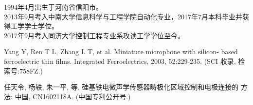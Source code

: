 \noindent 1994年4月出生于河南省信阳市。\\
\noindent 2013年9月考入中南大学信息科学与工程学院自动化专业，2017年7月本科毕业并获得工学学士学位。\\
\noindent 2017年9月考入同济大学控制工程专业系攻读工学学位至今。

\begin{enumerate}[{[}1{]}]
\item Yang Y, Ren T L, Zhang L T, et al. Miniature microphone with silicon-
  based ferroelectric thin films. Integrated Ferroelectrics, 2003,
  52:229-235. (SCI 收录, 检索号:758FZ.)
\end{enumerate}

\begin{enumerate}[{[}1{]}]
\item 任天令, 杨轶, 朱一平, 等. 硅基铁电微声学传感器畴极化区域控制和电极连接的
  方法: 中国, CN1602118A. (中国专利公开号.)
\end{enumerate}
